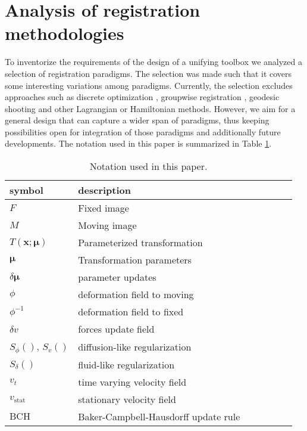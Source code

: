 \section{Analysis of registration methodologies}
\label{sec:analysis}

To inventorize the requirements of the design of a unifying toolbox
we analyzed a selection of registration paradigms.
The selection was made
such that it covers some interesting variations among paradigms.
Currently, the selection excludes approaches such as discrete
optimization \cite{Glocker:Drop} \cite{Heinrich:Deeds}, groupwise registration \cite{Wachinger:Simultaneous}, geodesic
shooting \cite{Ashburner:shooting} and other Lagrangian or Hamiltonian
\cite{Vialard:AdjointShooting} methods. However, we aim for a general design
that can capture a wider span of paradigms, thus keeping
possibilities open for integration of those paradigms and additionally future
developments. The notation used in this paper is summarized in Table
\ref{tab:symbols}.


\begin{table}[b]
\centering \caption{Notation used in this paper.}\label{tab:symbols}
\begin{tabular}{lllllll}
\toprule
symbol&description\\
\midrule
$F$         & Fixed image\\
$M$         & Moving image\\
$T(\bm{x};\bm{\mu})$ & Parameterized transformation\\
$\bm{\mu}$  & Transformation parameters\\
$\delta {\bm{\mu}}$  & parameter updates\\
$\phi$      & deformation field to moving\\
$\phi^{-1}$ & deformation field to fixed\\
$\delta v$  & forces update field\\
$S_\phi()$, $S_v()$  & diffusion-like regularization\\
$S_\delta()$& fluid-like regularization\\
$v_t$       & time varying velocity field\\
$v_\mathrm{stat}$   & stationary velocity field\\
$\mathrm{BCH}$  & Baker-Campbell-Hausdorff update rule\\%
\end{tabular}
\end{table}

